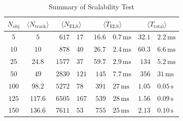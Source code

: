 
\begin{table}
  \centering
  \caption{Summary of Scalability Test}
  \label{tab:performance:elapsed}
  \begin{tabular}{ccr@{$\pm$}lr@{$\pm$}lr@{$\pm$}l}
    \toprule
    $N_\mathrm{obj}$
    & \multicolumn{1}{c}{$\langle N_\mathrm{track} \rangle$}
    & \multicolumn{2}{c}{$\langle N_\mathrm{ELS} \rangle$}
    & \multicolumn{2}{c}{$\langle T_\mathrm{ELS} \rangle$}
    & \multicolumn{2}{c}{$\langle T_\mathrm{total} \rangle$} \\
    \midrule
    $5$   & $5$     & $617$  & $17$
    & $16.6$ & $0.7\,\mathrm{ms}$
    & $32.1$ & $2.2\,\mathrm{ms}$ \\
    $10$  & $10$    & $878$  & $40$
    & $26.7$ & $2.4\,\mathrm{ms}$
    & $60.3$ & $6.6\,\mathrm{ms}$ \\
    $25$  & $24.8$  & $1577$ & $37$
    & $59.7$ & $2.9\,\mathrm{ms}$
    & $134$  & $5.2\,\mathrm{ms}$ \\
    $50$  & $49$    & $2830$ & $121$
    & $145$  & $7.7\,\mathrm{ms}$
    & $356$  & $31\,\mathrm{ms}$ \\
    $100$ & $98.2$  & $5272$ & $78$
    & $391$  & $27\,\mathrm{ms}$
    & $1.05$ & $0.05\,\mathrm{s}$ \\
    $125$ & $117.6$ & $6505$ & $167$
    & $539$  & $28\,\mathrm{ms}$
    & $1.56$ & $0.09\,\mathrm{s}$ \\
    $150$ & $136.6$ & $7611$ & $53$
    & $755$  & $25\,\mathrm{ms}$
    & $2.13$ & $0.10\,\mathrm{s}$ \\
    \bottomrule
  \end{tabular}
\end{table}

